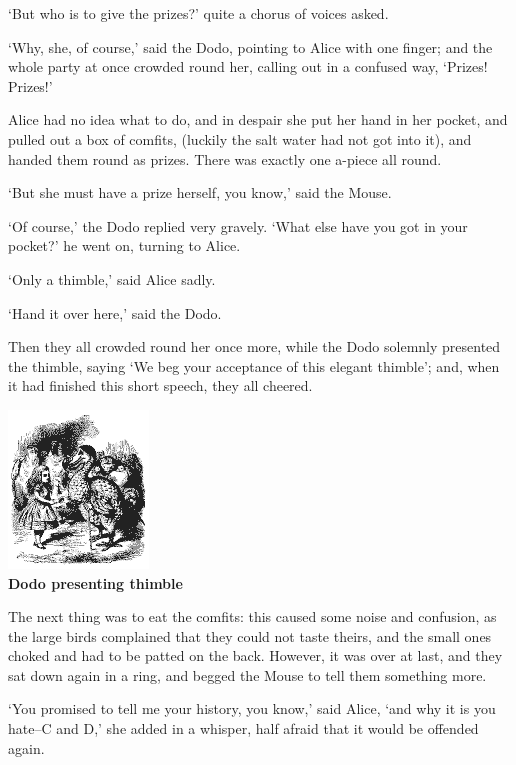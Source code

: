 \documentclass{article}
\begin{document}
`But who is to give the prizes?' quite a chorus of voices asked.

`Why, she, of course,' said the Dodo, pointing to Alice with one finger; and the whole party at once crowded round her, calling out in a confused way, `Prizes! Prizes!'

Alice had no idea what to do, and in despair she put her hand in her pocket, and pulled out a box of comfits, (luckily the salt water had not got into it), and handed them round as prizes. There was exactly one a-piece all round.

`But she must have a prize herself, you know,' said the Mouse.

`Of course,' the Dodo replied very gravely. `What else have you got in your pocket?' he went on, turning to Alice.

`Only a thimble,' said Alice sadly.

`Hand it over here,' said the Dodo.

Then they all crowded round her once more, while the Dodo solemnly presented the thimble, saying `We beg your acceptance of this elegant thimble'; and, when it had finished this short speech, they all cheered.

\begin{center}
    \includegraphics{DodoThimble}\\
    \textbf{Dodo presenting thimble}
\end{center}


The next thing was to eat the comfits: this caused some noise and confusion, as the large birds complained that they could not taste theirs, and the small ones choked and had to be patted on the back. However, it was over at last, and they sat down again in a ring, and begged the Mouse to tell them something more.

`You promised to tell me your history, you know,' said Alice, `and why it is you hate--C and D,' she added in a whisper, half afraid that it would be offended again.
\end{document}
